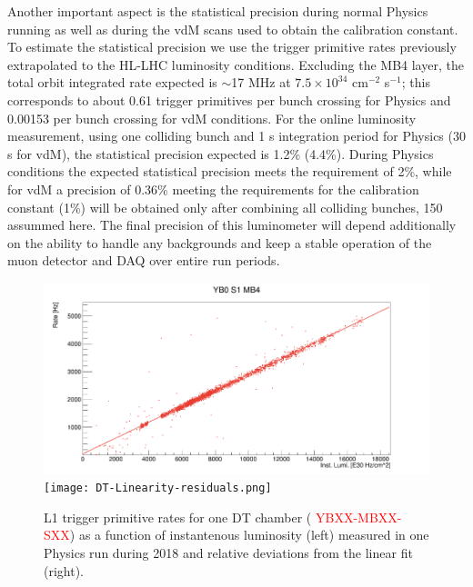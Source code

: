 Another important aspect is the statistical precision during normal Physics running as well as during the vdM scans used to obtain the calibration constant.
To estimate the statistical precision we use the trigger primitive rates previously extrapolated to the HL-LHC luminosity conditions.
Excluding the MB4 layer, the total orbit integrated rate expected is $\sim$17 MHz at $7.5\times10^{34}$ cm$^{-2}$ s$^{-1}$;
this corresponds to about 0.61 trigger primitives per bunch crossing for Physics and 0.00153 per bunch crossing for vdM conditions.    
For the online luminosity measurement, using one colliding bunch and 1 s integration period for Physics (30 s for vdM),
the statistical precision expected is 1.2\% (4.4\%).
During Physics conditions the expected statistical precision meets the requirement of 2\%,
while for vdM a precision of 0.36\%  meeting the requirements for the calibration constant (1\%) will be obtained only after combining all colliding bunches, 150 assummed here.
The final precision of this luminometer will depend additionally on the ability to handle any backgrounds and keep a stable operation of the muon detector and DAQ over entire run periods.




\begin{figure}[hbtp]
\centering
\includegraphics[width=.49\linewidth]{tex/Part2/fig/DT/DT-Linearity.png}
\texttt{[image: DT-Linearity-residuals.png]}
\caption{L1 trigger primitive rates for one DT chamber ( \textcolor{red}{YBXX-MBXX-SXX}) as a function of instantenous luminosity (left) measured in one Physics run during 2018
and relative deviations from the linear fit (right).} 
\label{fig:DT_linearity}
\end{figure}


